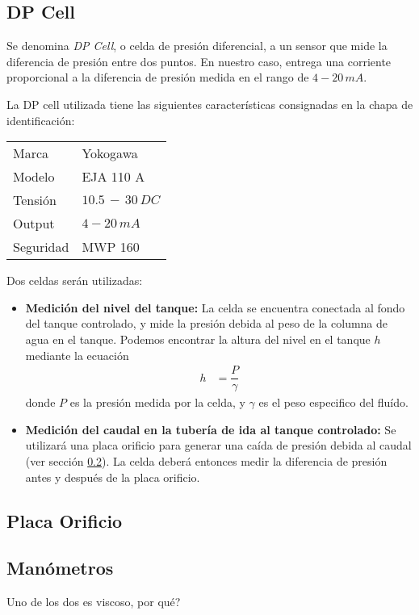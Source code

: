\subsection{DP Cell}
\label{subsec:DPCell}
Se denomina \textit{DP Cell}, o celda de presión diferencial, a un sensor
que mide la diferencia de presión entre dos puntos.
En nuestro caso, entrega una corriente proporcional a la diferencia de presión 
medida en el rango de $4-20\,mA$.

La DP cell utilizada tiene las siguientes características consignadas en 
la chapa de identificación:

\begin{center}
\begin{tabular}{|l|l|}
\hline
Marca & Yokogawa\\
Modelo & EJA 110 A\\
Tensión & $10.5\,-\,30 \, DC$\\
Output & $4-20\,mA$\\
Seguridad & MWP 160\\
\hline
\end{tabular}
\end{center}

Dos celdas serán utilizadas:
\begin{itemize}
 \item \textbf{Medición del nivel del tanque:} La celda se encuentra conectada
 al fondo del tanque controlado, y mide la presión debida al peso
 de la columna de agua en el tanque. 
 Podemos encontrar la altura del nivel en el tanque $h$ mediante la ecuación
 \begin{align}
  h &= \dfrac{P}{\gamma}
 \end{align}
donde $P$ es la presión medida por la celda, y $\gamma$ es el peso especifico
del fluído.
\item \textbf{Medición del caudal en la tubería de ida al tanque controlado:}
Se utilizará una placa orificio para generar una caída de presión debida al 
caudal (ver sección \ref{subsec:PlacaOrificio}). 
La celda deberá entonces medir la diferencia de presión antes y después
de la placa orificio.
\end{itemize}


\subsection{Placa Orificio}
\label{subsec:PlacaOrificio}

\subsection{Manómetros}
\label{subsec:Manometros}
Uno de los dos es viscoso, por qué? 
